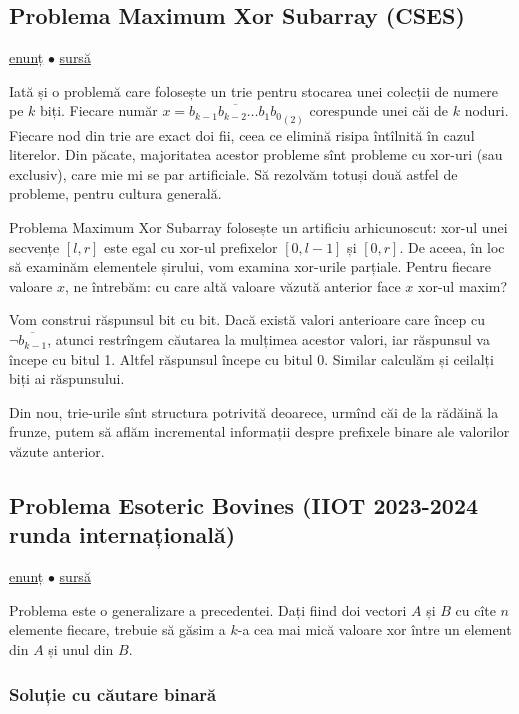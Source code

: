 \documentclass[../main.tex]{subfiles}
\begin{document}
\subsection{Problema Maximum Xor Subarray (CSES)}
\label{problem:maximum-xor-subarray}

\href{https://cses.fi/problemset/task/1655}{enunț}
$\bullet$
\hyperref[code:maximum-xor-subarray]{sursă}

Iată și o problemă care folosește un trie pentru stocarea unei colecții de numere pe $k$ biți. Fiecare număr $x = \overline{b_{k-1}b_{k-2} \dots b_1 b_0}_{(2)}$ corespunde unei căi de $k$ noduri. Fiecare nod din trie are exact doi fii, ceea ce elimină risipa întîlnită în cazul literelor. Din păcate, majoritatea acestor probleme sînt probleme cu xor-uri (sau exclusiv), care mie mi se par artificiale. Să rezolvăm totuși două astfel de probleme, pentru cultura generală.

Problema Maximum Xor Subarray folosește un artificiu arhicunoscut: xor-ul unei secvențe $[l, r]$ este egal cu xor-ul prefixelor $[0, l - 1]$ și $[0, r]$. De aceea, în loc să examinăm elementele șirului, vom examina xor-urile parțiale. Pentru fiecare valoare $x$, ne întrebăm: cu care altă valoare văzută anterior face $x$ xor-ul maxim?

Vom construi răspunsul bit cu bit. Dacă există valori anterioare care încep cu $\neg\overline{b_{k-1}}$, atunci restrîngem căutarea la mulțimea acestor valori, iar răspunsul va începe cu bitul 1. Altfel răspunsul începe cu bitul 0. Similar calculăm și ceilalți biți ai răspunsului.

Din nou, trie-urile sînt structura potrivită deoarece, urmînd căi de la rădăină la frunze, putem să aflăm incremental informații despre prefixele binare ale valorilor văzute anterior.

\subsection{Problema Esoteric Bovines (IIOT 2023-2024 runda internațională)}
\label{problem:esoteric-bovines}

\href{https://kilonova.ro/problems/2783}{enunț}
$\bullet$
\hyperref[code:esoteric-bovines]{sursă}

Problema este o generalizare a precedentei. Dați fiind doi vectori $A$ și $B$ cu cîte $n$ elemente fiecare, trebuie să găsim a $k$-a cea mai mică valoare xor între un element din $A$ și unul din $B$.

\subsubsection*{Soluție cu căutare binară}
\end{document}
